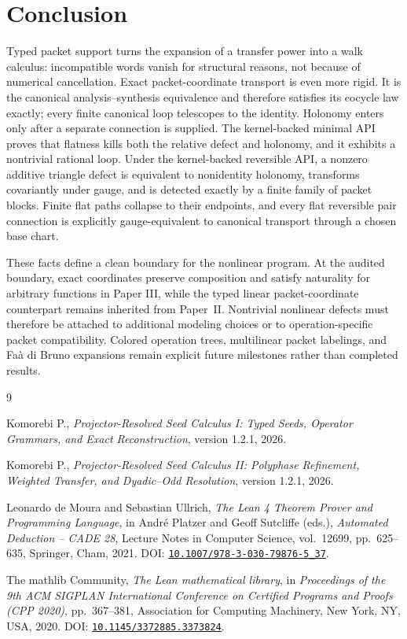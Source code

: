 \documentclass[11pt]{article}
\theoremstyle{definition}
\theoremstyle{remark}
\begin{document}
\section{Conclusion}

Typed packet support turns the expansion of a transfer power into a walk
calculus: incompatible words vanish for structural reasons, not because of
numerical cancellation.  Exact packet-coordinate transport is even more
rigid.  It is the canonical analysis--synthesis equivalence and therefore
satisfies its cocycle law exactly; every finite canonical loop telescopes to
the identity.  Holonomy enters only after a separate connection is supplied.
The kernel-backed minimal API proves that flatness kills both the relative
defect and holonomy, and it exhibits a nontrivial rational loop.  Under the
kernel-backed reversible API, a nonzero additive triangle defect is equivalent to nonidentity
holonomy, transforms covariantly under gauge, and is detected exactly by a
finite family of packet blocks.  Finite flat paths collapse to their endpoints,
and every flat reversible pair connection is explicitly gauge-equivalent to
canonical transport through a chosen base chart.

These facts define a clean boundary for the nonlinear program.  At the audited
boundary, exact coordinates preserve composition and satisfy naturality for
arbitrary functions in Paper III, while the typed linear packet-coordinate
counterpart remains inherited from Paper~II.  Nontrivial nonlinear defects
must therefore be attached to additional modeling choices or to
operation-specific packet compatibility.  Colored operation trees,
multilinear packet labelings, and Fa\`a di Bruno expansions remain explicit
future milestones rather than completed results.

\begin{thebibliography}{9}

Komorebi P.,
\emph{Projector-Resolved Seed Calculus I: Typed Seeds, Operator Grammars, and
Exact Reconstruction},
version 1.2.1, 2026.

Komorebi P.,
\emph{Projector-Resolved Seed Calculus II: Polyphase Refinement, Weighted
Transfer, and Dyadic--Odd Resolution},
version 1.2.1, 2026.

Leonardo de Moura and Sebastian Ullrich,
\emph{The Lean 4 Theorem Prover and Programming Language},
in Andr\'e Platzer and Geoff Sutcliffe (eds.),
\emph{Automated Deduction -- CADE 28}, Lecture Notes in Computer Science,
vol.~12699, pp.~625--635, Springer, Cham, 2021.
DOI: \href{https://doi.org/10.1007/978-3-030-79876-5_37}%
{\texttt{10.1007/978-3-030-79876-5\_37}}.

The mathlib Community,
\emph{The Lean mathematical library}, in
\emph{Proceedings of the 9th ACM SIGPLAN International Conference on
Certified Programs and Proofs (CPP 2020)}, pp.~367--381,
Association for Computing Machinery, New York, NY, USA, 2020.
DOI: \href{https://doi.org/10.1145/3372885.3373824}%
{\texttt{10.1145/3372885.3373824}}.

\end{thebibliography}
\end{document}
